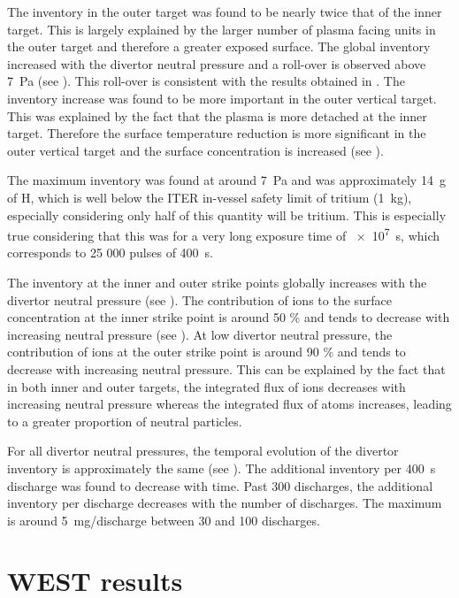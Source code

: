 The inventory in the outer target was found to be nearly twice that of the inner target.
This is largely explained by the larger number of plasma facing units in the outer target and therefore a greater exposed surface.
The global inventory increased with the divertor neutral pressure and a roll-over is observed above \SI{7}{Pa} (see ).
This roll-over is consistent with the results obtained in .
The inventory increase was found to be more important in the outer vertical target.
This was explained by the fact that the plasma is more detached at the inner target.
Therefore the surface temperature reduction is more significant in the outer vertical target and the surface concentration is increased (see ).

The maximum inventory was found at around \SI{7}{Pa} and was approximately \SI{14}{g} of H, which is well below the ITER in-vessel safety limit of tritium (\SI{1}{kg}), especially considering only half of this quantity will be tritium.
This is especially true considering that this was for a very long exposure time of \SI{e7}{s}, which corresponds to 25 000 pulses of \SI{400}{s}.


The inventory at the inner and outer strike points globally increases with the divertor neutral pressure (see ).
The contribution of ions to the surface concentration at the inner strike point is around 50 \% and tends to decrease with increasing neutral pressure (see ).
At low divertor neutral pressure, the contribution of ions at the outer strike point is around 90 \% and tends to decrease with increasing neutral pressure.
This can be explained by the fact that in both inner and outer targets, the integrated flux of ions decreases with increasing neutral pressure whereas the integrated flux of atoms increases, leading to a greater proportion of neutral particles.

For all divertor neutral pressures, the temporal evolution of the divertor inventory is approximately the same (see ).
The additional inventory per \SI{400}{s} discharge was found to decrease with time.
Past 300 discharges, the additional inventory per discharge decreases with the number of discharges.
The maximum is around \SI{5}{mg/discharge} between 30 and 100 discharges.

\section{WEST results}

